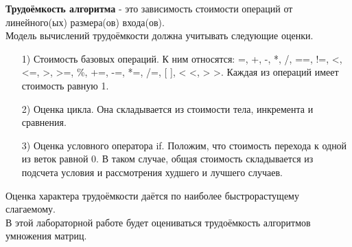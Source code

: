 \textbf{Трудоёмкость алгоритма} - это зависимость стоимости операций от линейного(ых) размера(ов) входа(ов).\\

Модель вычислений трудоёмкости должна учитывать следующие оценки.
\begin{itemize}
	\item[1)] Стоимость базовых операций. К ним относятся: =, +, -, *, /, ==, !=, <, <=, >, >=, \%, +=, -=, *=, /=, [ ], < <, > >. Каждая из операций имеет стоимость равную 1.
	\item[2)] Оценка цикла. Она складывается из стоимости тела, инкремента и сравнения. 
	\item[3)] Оценка условного оператора if. Положим, что стоимость перехода к одной из веток равной 0. В таком случае, общая стоимость складывается из подсчета условия и рассмотрения худшего и лучшего случаев.
\end{itemize}

Оценка характера трудоёмкости даётся по наиболее быстрорастущему слагаемому.\\

В этой лабораторной работе будет оцениваться трудоёмкость алгоритмов умножения матриц.